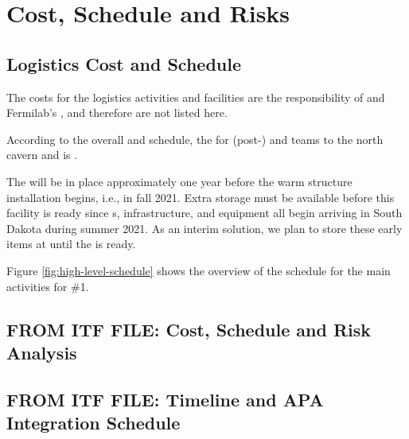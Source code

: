 \section{Cost, Schedule and Risks}


\subsection{Logistics Cost and Schedule} %
\label{sec:fdsp-tc-log-cost}

The costs for the logistics activities and facilities are the responsibility of  and Fermilab's , and therefore are not listed here. %

According to the overall  and  schedule, the  for  (post-) and  teams to the north cavern and  is \cucbenocc{}.

The   will be in place approximately one year before the warm structure installation begins, i.e., in fall 2021.  Extra storage must be available before  this facility is ready  since  s,  infrastructure, and equipment all begin arriving in South Dakota during summer 2021.  As an interim solution, we plan to store these early items at  until the  is ready.

Figure \ref{fig:high-level-schedule} shows the overview of the schedule for the main activities for  \#1. 


\subsection{FROM ITF FILE: Cost, Schedule and Risk Analysis}
\label{sec:fdsp-tc-itf-cost}


\subsection{FROM ITF FILE: Timeline and APA Integration Schedule}

